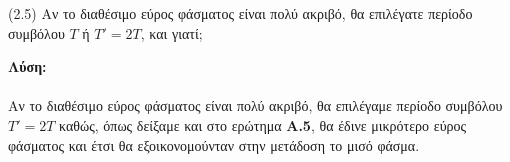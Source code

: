 \begin{justify}
    (2.5) Αν το διαθέσιμο εύρος φάσματος είναι πολύ ακριβό,
    θα επιλέγατε περίοδο συμβόλου $Τ$ ή $Τ'=2T$, και γιατί\textlatin{;}
\end{justify}

\begin{justify}
    {\bf Λύση:}\\\\
    Αν το διαθέσιμο εύρος φάσματος είναι πολύ ακριβό, θα επιλέγαμε
    περίοδο συμβόλου $Τ'=2T$ καθώς, όπως δείξαμε και στο ερώτημα
    {\bf Α.5}, θα έδινε μικρότερο εύρος φάσματος και έτσι θα εξοικονομούνταν
    στην μετάδοση το μισό φάσμα.
\end{justify}

